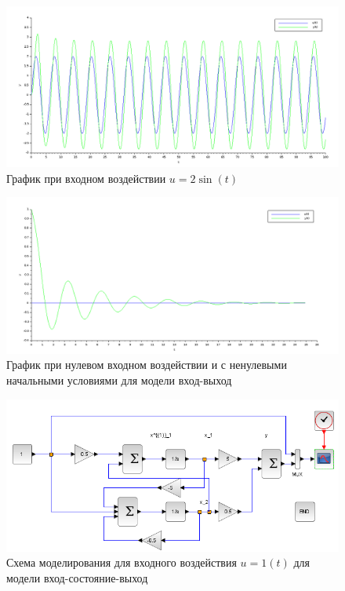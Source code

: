 \documentclass[12pt, a4paper] {ncc}
\begin{document}
		\begin{figure}[ht!]
    		\includegraphics[scale=0.4]{./plotiosin.png}
			\caption{График при входном воздействии $u = 2\sin(t)$}
		\end{figure}

		\begin{figure}[ht!]
    		\includegraphics[scale=0.4]{./plotiofree.png}
			\caption{График при нулевом входном воздействии и с ненулевыми начальными условиями для модели вход-выход}
		\end{figure}

		\begin{figure}[ht]
    		\includegraphics[scale=0.5]{./modelios1t.png}
			\caption{Схема моделирования для входного воздействия $u = 1(t)$ для модели вход-состояние-выход}
		\end{figure}
\end{document}
